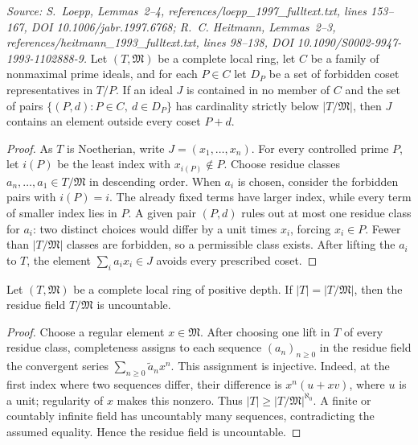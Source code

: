 \begin{lemma}
  \label{lem:cardinal_prime_avoidance}
  \textit{Source: S.~Loepp, Lemmas~2--4,
  references/loepp\_1997\_fulltext.txt, lines 153--167,
  DOI 10.1006/jabr.1997.6768; R.~C. Heitmann, Lemmas~2--3,
  references/heitmann\_1993\_fulltext.txt, lines 98--138,
  DOI 10.1090/S0002-9947-1993-1102888-9.}
  Let \((T,\mathfrak M)\) be a complete local ring, let \(C\) be a family of
  nonmaximal prime ideals, and for each \(P\in C\) let \(D_P\) be a set of
  forbidden coset representatives in \(T/P\).  If an ideal \(J\) is
  contained in no member of \(C\) and the set of pairs
  \(\{(P,d):P\in C,\ d\in D_P\}\) has cardinality strictly below
  \(|T/\mathfrak M|\), then \(J\) contains an element outside every coset
  \(P+d\).
\end{lemma}

\begin{proof}
  As \(T\) is Noetherian, write \(J=(x_1,\ldots,x_n)\).  For every controlled
  prime \(P\), let \(i(P)\) be the least index with \(x_{i(P)}\notin P\).
  Choose residue classes \(a_n,\ldots,a_1\in T/\mathfrak M\) in descending
  order.  When \(a_i\) is chosen, consider the forbidden pairs with
  \(i(P)=i\).  The already fixed terms have larger index, while every term
  of smaller index lies in \(P\).  A given pair \((P,d)\) rules out at most
  one residue class for \(a_i\): two distinct choices would differ by a unit
  times \(x_i\), forcing \(x_i\in P\).  Fewer than
  \(|T/\mathfrak M|\) classes are forbidden, so a permissible class exists.
  After lifting the \(a_i\) to \(T\), the element
  \(\sum_i a_i x_i\in J\) avoids every prescribed coset.
\end{proof}

\begin{lemma}
  \label{lem:jensen_residue_uncountable}
  Let \((T,\mathfrak M)\) be a complete local ring of positive depth.  If
  \(|T|=|T/\mathfrak M|\), then the residue field \(T/\mathfrak M\) is
  uncountable.
\end{lemma}

\begin{proof}
  Choose a regular element \(x\in\mathfrak M\).  After choosing one lift in
  \(T\) of every residue class, completeness assigns to each sequence
  \((a_n)_{n\geq0}\) in the residue field the convergent series
  \(\sum_{n\geq0}\widetilde a_nx^n\).  This assignment is injective.  Indeed,
  at the first index where two sequences differ, their difference is
  \(x^n(u+xv)\), where \(u\) is a unit; regularity of \(x\) makes this
  nonzero.  Thus \(|T|\geq|T/\mathfrak M|^{\aleph_0}\).  A finite or countably
  infinite field has uncountably many sequences, contradicting the assumed
  equality.  Hence the residue field is uncountable.
\end{proof}

